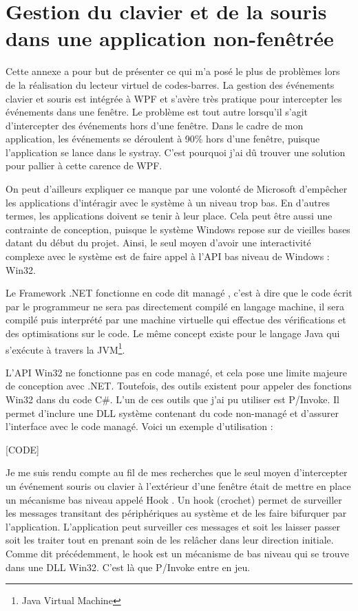 \chapter{Gestion du clavier et de la souris dans une application non-fenêtrée}
\label{hook}

Cette annexe a pour but de présenter ce qui m'a posé le plus de problèmes lors de la réalisation du lecteur virtuel de codes-barres. La gestion des événements clavier et souris est intégrée à WPF et s'avère très pratique pour intercepter les événements dans une fenêtre. Le problème est tout autre lorsqu'il s'agit d'intercepter des événements hors d'une fenêtre. Dans le cadre de mon application, les événements se déroulent à 90\% hors d'une fenêtre, puisque l'application se lance dans le systray. C'est pourquoi j'ai dû trouver une solution pour pallier à cette carence de WPF.

On peut d'ailleurs expliquer ce manque par une volonté de Microsoft d'empêcher les applications d'intéragir avec le système à un niveau trop bas. En d'autres termes, les applications doivent se tenir à leur place. Cela peut être aussi une contrainte de conception, puisque le système Windows repose sur de vieilles bases datant du début du projet. Ainsi, le seul moyen d'avoir une interactivité complexe avec le système est de faire appel à l'API bas niveau de Windows : Win32.

Le Framework .NET fonctionne en code dit \og managé \fg{}, c'est à dire que le code écrit par le programmeur ne sera pas directement compilé en langage machine, il sera compilé puis interprété par une machine virtuelle qui effectue des vérifications et des optimisations sur le code. Le même concept existe pour le langage Java qui s'exécute à travers la JVM\footnote{Java Virtual Machine}.

L'API Win32 ne fonctionne pas en code managé, et cela pose une limite majeure de conception avec .NET. Toutefois, des outils existent pour appeler des fonctions Win32 dans du code C\#. L'un de ces outils que j'ai pu utiliser est P/Invoke. Il permet d'inclure une DLL système contenant du code non-managé et d'assurer l'interface avec le code managé. Voici un exemple d'utilisation :

[CODE]

Je me suis rendu compte au fil de mes recherches que le seul moyen d'intercepter un événement souris ou clavier à l'extérieur d'une fenêtre était de mettre en place un mécanisme bas niveau appelé \og Hook \fg{}. Un hook (crochet) permet de surveiller les messages transitant des périphériques au système et de les faire bifurquer par l'application. L'application peut surveiller ces messages et soit les laisser passer soit les traiter tout en prenant soin de les relâcher dans leur direction initiale. Comme dit précédemment, le hook est un mécanisme de bas niveau qui se trouve dans une DLL Win32. C'est là que P/Invoke entre en jeu.

